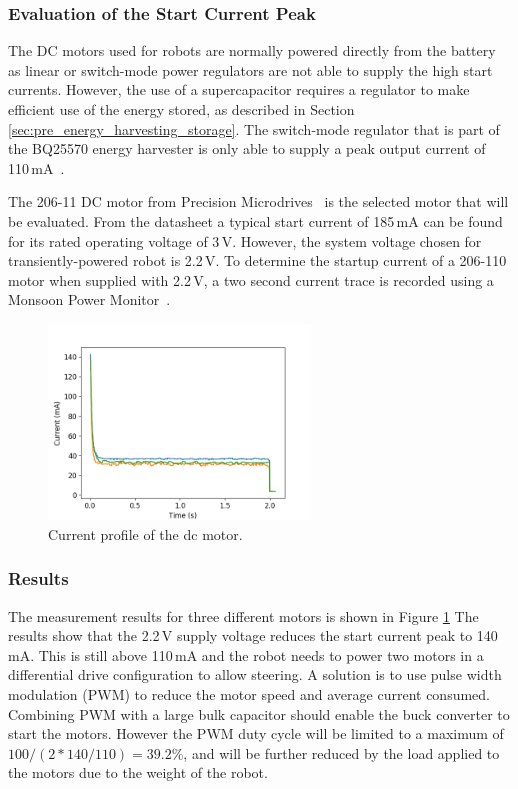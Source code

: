 \subsubsection{Evaluation of the Start Current Peak}
The DC motors used for robots are normally powered directly from the battery as linear or switch-mode power regulators are not able to supply the high start currents.
However, the use of a supercapacitor requires a regulator to make efficient use of the energy stored, as described in Section \ref{sec:pre_energy_harvesting_storage}.
The switch-mode regulator that is part of the BQ25570 energy harvester is only able to supply a peak output current of 110\,mA~\cite{bq25570_2017}.

The 206-11 DC motor from Precision Microdrives~\cite{gearmotor_206-110_2017} is the selected motor that will be evaluated.
From the datasheet a typical start current of 185\,mA can be found for its rated operating voltage of 3\,V.
However, the system voltage chosen for transiently-powered robot is 2.2\,V.
To determine the startup current of a 206-110 motor when supplied with 2.2\,V, a two second current trace is recorded using a Monsoon Power Monitor~\cite{monsoon_powermonitor_2017}.


\begin{figure}%
	\centering
	\includegraphics[width=0.62\textwidth]{pics/free_running_current.png}
	\caption{Current profile of the dc motor.}
	\label{fig:free_running_current}
\end{figure}

\subsubsection{Results}
The measurement results for three different motors is shown in Figure \ref{fig:free_running_current}
The results show that the 2.2\,V supply voltage reduces the start current peak to 140\,mA.
This is still above 110\,mA and the robot needs to power two motors in a differential drive configuration to allow steering.
A solution is to use pulse width modulation (PWM) to reduce the motor speed and average current consumed.
Combining PWM with a large bulk capacitor should enable the buck converter to start the motors.
However the PWM duty cycle will be limited to a maximum of $100/(2*140/110) = 39.2\%$, and will be further reduced by the load applied to the motors due to the weight of the robot.


